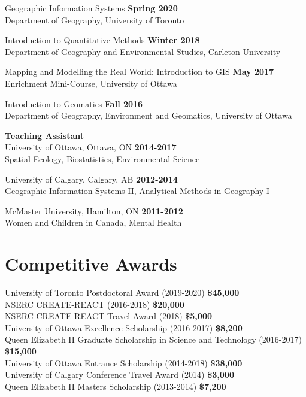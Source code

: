 \documentclass[margin,line]{res}
\begin{document}
\begin{resume}
Geographic Information Systems \hfill {\textbf{Spring 2020}}\\
Department of Geography, University of Toronto

Introduction to Quantitative Methods
 \hfill {\textbf{Winter 2018}}\\
Department of Geography and Environmental Studies, Carleton University

Mapping and Modelling the Real World: Introduction to GIS \hfill {\textbf{May 2017}}\\
Enrichment Mini-Course, University of Ottawa

Introduction to Geomatics
\hfill {\textbf{Fall 2016}}\\
Department of Geography, Environment and Geomatics, University of Ottawa

\textbf{Teaching Assistant }\\
University of Ottawa, Ottawa, ON
\hfill {\textbf{2014-2017}}\\
Spatial Ecology, Biostatistics, Environmental Science

University of Calgary, Calgary, AB
\hfill {\textbf{2012-2014}}\\
Geographic Information Systems II, Analytical Methods in Geography I

McMaster University, Hamilton, ON
\hfill {\textbf{2011-2012}}\\
Women and Children in Canada, Mental Health

\vspace*{.1in}

\section{\sc Competitive Awards}

University of Toronto Postdoctoral Award
(2019-2020)
\hfill {\textbf{\$45,000}}\\
NSERC CREATE-REACT (2016-2018)
\hfill {\textbf{\$20,000}}\\
NSERC CREATE-REACT Travel Award (2018)
\hfill {\textbf{\$5,000}}\\
University of Ottawa Excellence Scholarship (2016-2017)
\hfill {\textbf{\$8,200}}\\
Queen Elizabeth II Graduate Scholarship in Science and Technology (2016-2017)
\hfill {\textbf{\$15,000}}\\
University of Ottawa Entrance Scholarship (2014-2018)
\hfill {\textbf{\$38,000}}\\
University of Calgary Conference Travel Award (2014)
\hfill {\textbf{\$3,000}}\\
Queen Elizabeth II Masters Scholarship (2013-2014)
\hfill {\textbf{\$7,200}}


\end{resume}
\end{document}
